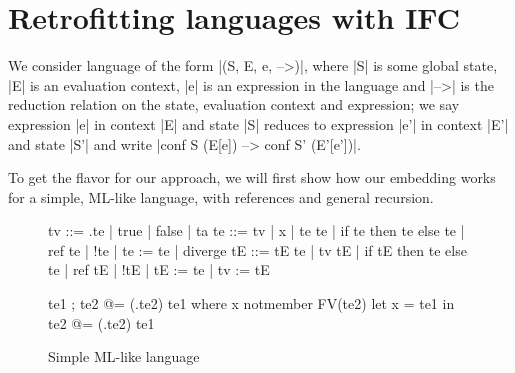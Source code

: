 \section{Retrofitting languages with IFC}
\label{sec:retrofit}

We consider language of the form |(S, E, e, -->)|, where |S| is some
global state, |E| is an evaluation context, |e| is an expression in
the language and |-->| is the reduction relation on the state,
evaluation context and expression;
we say expression |e| in context |E| and state |S| reduces to
expression |e'| in context |E'| and state |S'| and write
|conf S (E[e]) --> conf S' (E'[e'])|.


To get the flavor for our approach, we will first show how our embedding
works for a simple, ML-like language, with references and general recursion.

\begin{figure}
\begin{code}
tv   ::= \x.te | true | false | ta
te   ::= tv | x | te te | if te then te else te | ref te | !te | te := te | diverge
tE   ::= tE te | tv tE | if tE then te else te
       | ref tE | !tE | tE := te | tv := tE 

te1 ; te2           @= (\x.te2) te1  where  x notmember FV(te2)
let x = te1 in te2  @= (\x.te2) te1
\end{code}


\caption{Simple ML-like language}
\label{fig:ml}
\end{figure}

